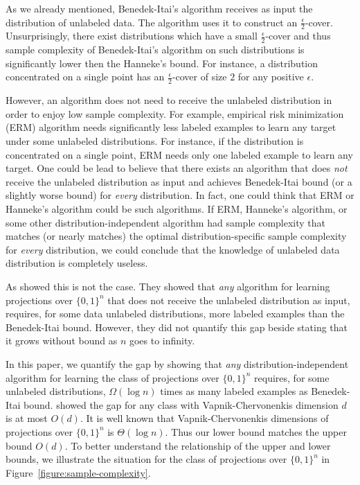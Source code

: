 \documentclass[11pt]{article}
\begin{document}
As we already mentioned, Benedek-Itai's algorithm receives as input the
distribution of unlabeled data. The algorithm uses it to construct an
$\frac{\epsilon}{2}$-cover. Unsurprisingly, there exist distributions which have
a small $\frac{\epsilon}{2}$-cover and thus sample complexity of Benedek-Itai's
algorithm on such distributions is significantly lower then the Hanneke's bound.
For instance, a distribution concentrated on a single point has an
$\frac{\epsilon}{2}$-cover of size $2$ for any positive $\epsilon$.

However, an algorithm does not need to receive the unlabeled distribution in
order to enjoy low sample complexity. For example, empirical risk minimization
(ERM) algorithm needs significantly less labeled examples to learn any target
under some unlabeled distributions. For instance, if the distribution is
concentrated on a single point, ERM needs only one labeled example to learn any
target. One could be lead to believe that there exists an algorithm that does
\emph{not} receive the unlabeled distribution as input and achieves Benedek-Itai
bound (or a slightly worse bound) for \emph{every} distribution. In fact, one
could think that ERM or Hanneke's algorithm could be such algorithms. If ERM,
Hanneke's algorithm, or some other distribution-independent algorithm had sample
complexity that matches (or nearly matches) the optimal distribution-specific
sample complexity for \emph{every} distribution, we could conclude that the
knowledge of unlabeled data distribution is completely useless.

As \citet{Darnstadt-Simon-Szorenyi-2013} showed this is not the case. They showed
that \emph{any} algorithm for learning projections over $\{0,1\}^n$ that does
not receive the unlabeled distribution as input, requires, for some data
unlabeled distributions, more labeled examples than the Benedek-Itai bound.
However, they did not quantify this gap beside stating that it grows without
bound as $n$ goes to infinity.

In this paper, we quantify the gap by showing that \emph{any}
distribution-independent algorithm for learning the class of projections over
$\{0,1\}^n$ requires, for some unlabeled distributions, $\Omega(\log n)$ times
as many labeled examples as Benedek-Itai bound.
\citet{Darnstadt-Simon-Szorenyi-2013} showed the gap for any class with
Vapnik-Chervonenkis dimension $d$ is at most $O(d)$. It is well known that
Vapnik-Chervonenkis dimensions of projections over $\{0,1\}^n$ is $\Theta(\log
n)$. Thus our lower bound matches the upper bound $O(d)$. To better understand
the relationship of the upper and lower bounds, we illustrate the situation for
the class of projections over $\{0,1\}^n$ in
Figure~\ref{figure:sample-complexity}.
\end{document}
